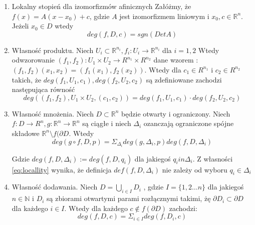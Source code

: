 \begin{enumerate}
    \item Lokalny stopień dla izomorfizmów afinicznych \newline
    Załóżmy, że $ f(x) = A(x-x_0) + c $, gdzie $ A $ jest izomorfizmem liniowym i $ x_0,c \in \mathbb R^n $. 
    Jeżeli $ x_0 \in D$ wtedy
    \begin{equation}
        deg(f,D,c) = sgn(Det A)
    \end{equation}
    
    \item Własność produktu. \newline
     Niech $ U_i \subset \mathbb R^{n_i}, f_i : U_i  \to \mathbb R^{n_i} $ dla $ i =1,2 $
     Wtedy odwzorowanie $ (f_1,f_2) : U_1 \times U_2 \to R^{n_1} \times R^{n_2} $ dane wzorem :
     $ (f_1,f_2)(x_1,x_2) = (f_1(x_1),f_2(x_2)) $. Wtedy dla $c_1 \in R^{n_1}  $ i $ c_2 \in R^{n_2} $ takich, że $ deg(f_1,U_1,c_1),deg(f_2,U_2,c_2) $ są zdefiniowane 
     zachodzi następująca równość 
     \begin{equation}
	deg((f_1,f_2), U_1 \times U_2 , (c_1,c_2)) = deg(f_1,U_1,c_1) \cdot deg(f_2,U_2,c_2)
     \end{equation}
     
     \item Własność mnożenia. \newline
     Niech $ D \subset \mathbb R^n $ będzie otwarty i ograniczony. Niech $ f : D \to R^n , g : \mathbb R^n \to \mathbb R^n $ są ciągłe i niech $ \Delta_i $ ozanczają 
     ograniczone spójne składowe $ \mathbb R^n \setminus f(\partial{D}$. Wtedy 
     \begin{equation}
	  deg (g \circ f ,D,p) = \Sigma_{\Delta_i} deg(g,\Delta_i,p)deg(f,D,\Delta_i) 
     \end{equation}
     
     Gdzie $ deg(f,D,\Delta_i) := deg(f,D,q_i)$ dla jakiegoś $ q_i in \Delta_i $. Z własności \ref{eq:locallity} wynika, że definicja $ def(f,D,\Delta_i ) $ nie zależy od wyboru
     $ q_i \in \Delta_i $
     
     \item Własność dodawania. \newline
     Niech $ D = \bigcup_{i \in I} D_i $ , gdzie $ I = \{1,2 \dots n \} $ dla jakiegoś $ n \in \mathbb N $ i $ D_i $ są zbiorami otwartymi parami rozłącznymi takimi, żę 
     $ \partial{D_i} \subset \partial{D} $ dla każdego $ i \in I $. Wtedy dla każdego $ c \notin f(\partial{D})  $ zachodzi:
     \begin{equation}
	deg(f,D,c) = \Sigma_{i \in I} deg(f,D_i,c)
     \end{equation}
\end{enumerate}

